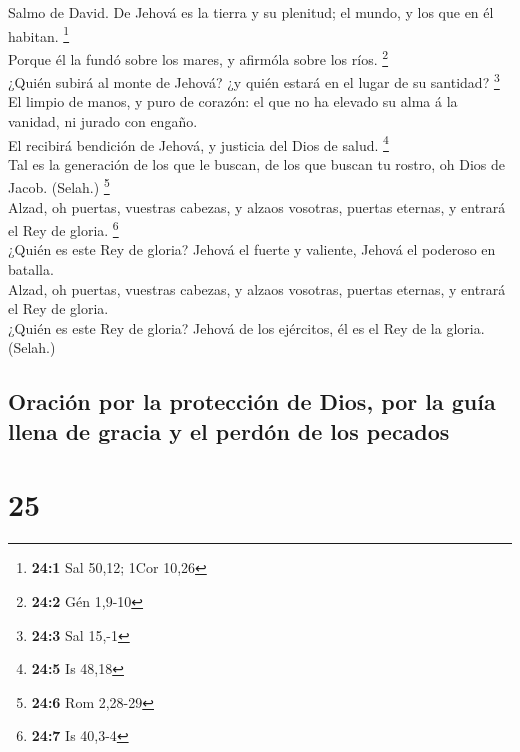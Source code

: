  Salmo de David. De Jehová es la tierra y su plenitud; el
mundo, y los que en él habitan. \footnote{\textbf{24:1} Sal 50,12; 1Cor
  10,26}\\
 Porque él la fundó sobre los mares, y afirmóla sobre los
ríos. \footnote{\textbf{24:2} Gén 1,9-10}\\
 ¿Quién subirá al monte de Jehová? ¿y quién estará en el
lugar de su santidad? \footnote{\textbf{24:3} Sal 15,-1}\\
 El limpio de manos, y puro de corazón: el que no ha elevado
su alma á la vanidad, ni jurado con engaño.\\
 El recibirá bendición de Jehová, y justicia del Dios de
salud. \footnote{\textbf{24:5} Is 48,18}\\
 Tal es la generación de los que le buscan, de los que
buscan tu rostro, oh Dios de Jacob. (Selah.) \footnote{\textbf{24:6} Rom
  2,28-29}\\
 Alzad, oh puertas, vuestras cabezas, y alzaos vosotras,
puertas eternas, y entrará el Rey de gloria. \footnote{\textbf{24:7} Is
  40,3-4}\\
 ¿Quién es este Rey de gloria? Jehová el fuerte y valiente,
Jehová el poderoso en batalla.\\
 Alzad, oh puertas, vuestras cabezas, y alzaos vosotras,
puertas eternas, y entrará el Rey de gloria.\\
 ¿Quién es este Rey de gloria? Jehová de los ejércitos, él
es el Rey de la gloria. (Selah.)

\hypertarget{oraciuxf3n-por-la-protecciuxf3n-de-dios-por-la-guuxeda-llena-de-gracia-y-el-perduxf3n-de-los-pecados}{%
\subsection{Oración por la protección de Dios, por la guía llena de
gracia y el perdón de los
pecados}\label{oraciuxf3n-por-la-protecciuxf3n-de-dios-por-la-guuxeda-llena-de-gracia-y-el-perduxf3n-de-los-pecados}}

\hypertarget{section-24}{%
\section{25}\label{section-24}}

